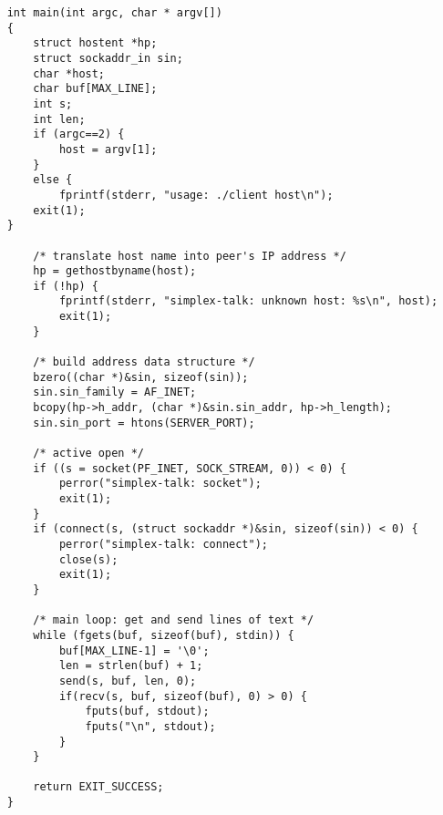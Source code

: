 \documentclass[a4paper,10pt]{article}
\begin{document}
\begin{itemize}
\begin{lstlisting}
    int main(int argc, char * argv[])
    {
    	struct hostent *hp;
    	struct sockaddr_in sin;
    	char *host;
    	char buf[MAX_LINE];
    	int s;
    	int len;
    	if (argc==2) {
    		host = argv[1];
    	}
    	else {
    		fprintf(stderr, "usage: ./client host\n");
    	exit(1);
    }
    
    	/* translate host name into peer's IP address */
    	hp = gethostbyname(host);
    	if (!hp) {
    		fprintf(stderr, "simplex-talk: unknown host: %s\n", host);
    		exit(1);
    	}
    
    	/* build address data structure */
    	bzero((char *)&sin, sizeof(sin));
    	sin.sin_family = AF_INET;
    	bcopy(hp->h_addr, (char *)&sin.sin_addr, hp->h_length);
    	sin.sin_port = htons(SERVER_PORT);
    
    	/* active open */
    	if ((s = socket(PF_INET, SOCK_STREAM, 0)) < 0) {
    		perror("simplex-talk: socket");
    		exit(1);
    	}
    	if (connect(s, (struct sockaddr *)&sin, sizeof(sin)) < 0) {
    		perror("simplex-talk: connect");
    		close(s);
    		exit(1);
    	}

    	/* main loop: get and send lines of text */
    	while (fgets(buf, sizeof(buf), stdin)) {
    		buf[MAX_LINE-1] = '\0';
    		len = strlen(buf) + 1;
    		send(s, buf, len, 0);
    		if(recv(s, buf, sizeof(buf), 0) > 0) {
    			fputs(buf, stdout);
    			fputs("\n", stdout);
    		}
    	}
    
    	return EXIT_SUCCESS;
    }
            \end{lstlisting}
    \end{itemize}
\end{document}
